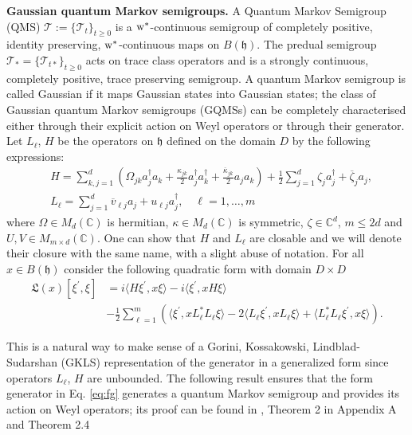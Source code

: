 \documentclass[preprint]{elsarticle}
\theoremstyle{definition}
\def\hh{\mathfrak{h} }
\def\CC{\mathbb{C}}
\def\TT{\mathcal{T}}
\def\hh{\mathfrak{h}}
\begin{document}
\bigskip \textbf{Gaussian quantum Markov semigroups.} A Quantum Markov Semigroup (QMS) $\TT:=\{\TT_t\}_{t \geq 0}$ is a ${\rm w}^*$-continuous semigroup of completely positive, identity preserving, ${\rm w}^*$-continuous maps on $B(\hh)$. The predual semigroup $\TT_* = \{\TT_{t*}\}_{t\geq0}$ acts on trace class operators and is a strongly continuous, completely positive, trace preserving semigroup. A quantum Markov semigroup is called Gaussian if it maps Gaussian states into Gaussian states; the class of Gaussian quantum Markov semigroups (GQMSs) can be completely characterised either through their explicit action on Weyl operators or through their generator. Let $L_\ell$, $H$ be the operators on $\hh$ defined on the domain $D$ by the following expressions:
\begin{align}
&H=\sum_{k,j=1}^{d} \left ( \Omega_{jk} a^\dagger_j a_k + \frac{\kappa_{jk}}{2}a_j^\dagger a_k^\dagger+\frac{\overline{\kappa}_{jk}}{2}a_j a_k\right )+\frac{1}{2}\sum_{j=1}^{d} \zeta_j a_j^\dagger + \overline{\zeta}_j a_j,\\ \label{eq:hami}
&L_\ell=\sum_{j=1}^{d} \overline{v}_{\ell j}a_j+u_{\ell j}a_j^\dagger, \quad \ell=1,\dots, m
\end{align}
where $\Omega \in M_d(\CC)$ is hermitian, $\kappa \in M_d(\CC)$ is symmetric, $\zeta \in \CC^d$, $m \leq 2d$ and $U,V \in M_{m\times d}(\CC)$. One can show that $H$ and $L_\ell$ are closable and we will denote their closure with the same name, with a slight abuse of notation. For all $x \in B(\hh)$ consider the following quadratic form with domain $D\times D$
\begin{equation} \label{eq:fg} \begin{split}\mathfrak{L}(x)[\xi^\prime, \xi] &= i \langle H\xi^\prime, x\xi\rangle -i \langle \xi^\prime, xH\xi \rangle\\
&-\frac{1}{2}\sum_{\ell=1}^{m}(\langle \xi^\prime,xL^*_\ell L_\ell\xi \rangle - 2 \langle L_\ell\xi^\prime,x L_\ell\xi \rangle +\langle L^*_\ell L_\ell\xi^\prime,x\xi \rangle). \end{split}\end{equation}

This is a natural way to make sense of a Gorini, Kossakowski, Lindblad-Sudarshan
(GKLS) representation of the generator in a generalized form since operators $L_\ell$, $H$ are unbounded. The following result ensures that the form generator in Eq. \eqref{eq:fg} generates a quantum Markov semigroup and provides its action on Weyl operators; its proof can
be found in \cite{AFP22},
Theorem 2 in Appendix A and Theorem 2.4
\end{document}
